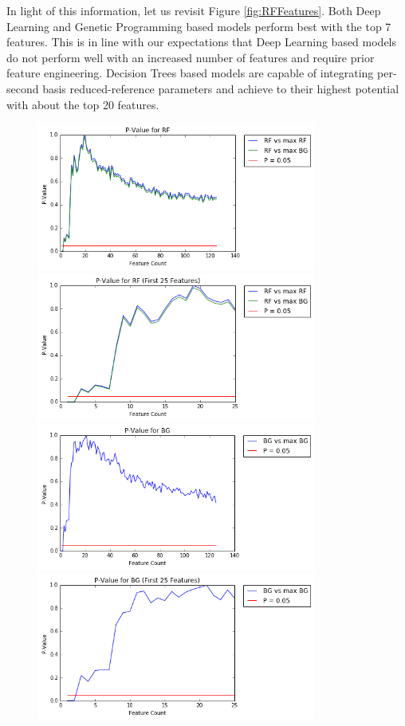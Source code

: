 \documentclass[journal]{IEEEtran}
\begin{document}
In light of this information, let us revisit Figure \ref{fig:RFFeatures}. Both Deep Learning and Genetic Programming based models perform best with the top 7 features. This is in line with our expectations that Deep Learning based models do not perform well with an increased number of features and require prior feature engineering. Decision Trees based models are capable of integrating per-second basis reduced-reference parameters and achieve to their highest potential with about the top 20 features. 

\begin{figure}[ht!]
\includegraphics[width=3.6in]{./prf.png}
\includegraphics[width=3.6in]{./prfzoom.png}
\includegraphics[width=3.6in]{./pbg.png}
\includegraphics[width=3.6in]{./pbgzoom.png}

\end{figure}
\end{document}
